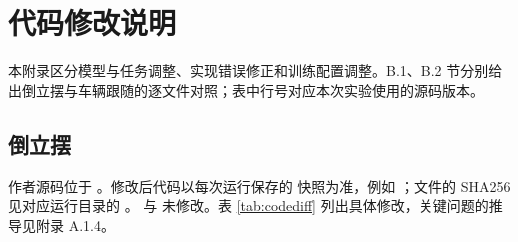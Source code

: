\documentclass[UTF8,a4paper,zihao=-4,fontset=fandol]{ctexart}
\begin{document}
\FloatBarrier
\section{代码修改说明}
\label{app:code}
本附录区分模型与任务调整、实现错误修正和训练配置调整。B.1、B.2 节分别给出倒立摆与车辆跟随的逐文件对照；表中行号对应本次实验使用的源码版本。

\subsection{倒立摆}
\label{app:code-pend}
作者源码位于 。修改后代码以每次运行保存的  快照为准，例如 ；文件的 SHA256 见对应运行目录的 。 与  未修改。表 \ref{tab:codediff} 列出具体修改，关键问题的推导见附录 A.1.4。
\end{document}
